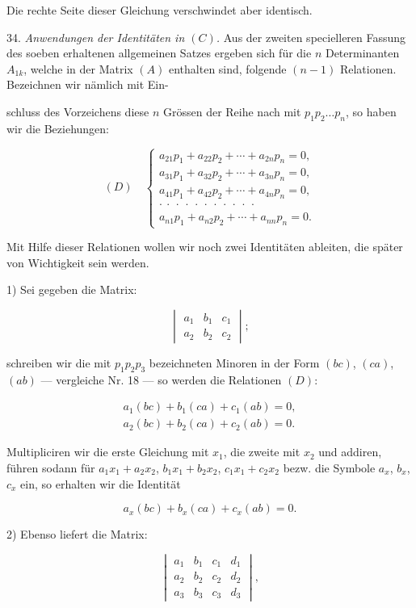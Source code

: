 \documentclass[11pt]{article}
\providecommand{\weberpage}[1]{}
\providecommand{\weq}[2]{\begin{equation}\tag{#1}#2\end{equation}}
\begin{document}
Die rechte Seite dieser Gleichung verschwindet aber identisch.

34. \textit{Anwendungen der Identitäten in $(C)$.} Aus der zweiten
specielleren Fassung des soeben erhaltenen allgemeinen Satzes ergeben
sich für die $n$ Determinanten $A_{1k}$, welche in der Matrix $(A)$
enthalten sind, folgende $(n-1)$ Relationen. Bezeichnen wir nämlich mit
Ein-


\weberpage{39}
schluss des Vorzeichens diese $n$ Grössen der Reihe nach mit $p_1p_2\ldots
p_n$, so haben wir die Beziehungen:

\[
(D)\quad
\begin{cases}
a_{21}p_1+a_{22}p_2+\cdots+a_{2n}p_n=0,\\
a_{31}p_1+a_{32}p_2+\cdots+a_{3n}p_n=0,\\
a_{41}p_1+a_{42}p_2+\cdots+a_{4n}p_n=0,\\
\cdot\ \cdot\ \cdot\ \cdot\ \cdot\ \cdot\ \cdot\ \cdot\ \cdot\ \cdot\ \cdot\\
a_{n1}p_1+a_{n2}p_2+\cdots+a_{nn}p_n=0.
\end{cases}
\]

Mit Hilfe dieser Relationen wollen wir noch zwei Identitäten ableiten,
die später von Wichtigkeit sein werden.

1) Sei gegeben die Matrix:

\[
\begin{vmatrix}
a_1 & b_1 & c_1 \\
a_2 & b_2 & c_2
\end{vmatrix};
\]

schreiben wir die mit $p_1p_2p_3$ bezeichneten Minoren in der Form
$(bc)$, $(ca)$, $(ab)$ --- vergleiche Nr. 18 --- so werden die Relationen
$(D)$:

\[
\begin{gathered}
a_1(bc)+b_1(ca)+c_1(ab)=0,\\
a_2(bc)+b_2(ca)+c_2(ab)=0.
\end{gathered}
\]

Multipliciren wir die erste Gleichung mit $x_1$, die zweite mit $x_2$ und
addiren, führen sodann für $a_1x_1+a_2x_2$, $b_1x_1+b_2x_2$,
$c_1x_1+c_2x_2$ bezw. die Symbole $a_x$, $b_x$, $c_x$ ein, so erhalten
wir die Identität

\weq{I}{a_x(bc)+b_x(ca)+c_x(ab)=0.}

2) Ebenso liefert die Matrix:

\[
\begin{vmatrix}
a_1 & b_1 & c_1 & d_1 \\
a_2 & b_2 & c_2 & d_2 \\
a_3 & b_3 & c_3 & d_3
\end{vmatrix},
\]
\end{document}

